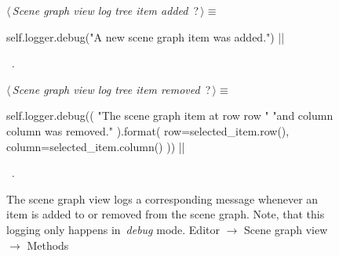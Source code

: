 \documentclass[%
    a4paper,    %
    justified,  %
    nobib,      %
    openany     %
]{tufte-book}
\makeatletter
\renewcommand{\label}[1]{\@tufte@label{##1}}%
\makeatother
\begin{document}
\begin{figure}
\begin{flushleft} \small
\begin{minipage}{\linewidth}\label{scrap60}\raggedright\small
{} $\langle\,${\itshape Scene graph view log tree item added}\nobreak\ {\footnotesize {?}}$\,\rangle\equiv$
\vspace{-1ex}
\begin{pythoncode}
self.logger.debug("A new scene graph item was added.")
|\NWsep|
\end{pythoncode}
\vspace{1.5ex}
\footnotesize
\begin{list}{}{\setlength{\itemsep}{-\parsep}\setlength{\itemindent}{-\leftmargin}}
\item \NWtxtMacroRefIn\ .

\item{}
\end{list}
\end{minipage}\vspace{4ex}
\end{flushleft}
\begin{flushleft} \small
\begin{minipage}{\linewidth}\label{scrap61}\raggedright\small
{} $\langle\,${\itshape Scene graph view log tree item removed}\nobreak\ {\footnotesize {?}}$\,\rangle\equiv$
\vspace{-1ex}
\begin{pythoncode}
self.logger.debug((
    "The scene graph item at row {row} "
    "and column {column} was removed."
).format(
    row=selected_item.row(),
    column=selected_item.column()
))
|\NWsep|
\end{pythoncode}
\vspace{1.5ex}
\footnotesize
\begin{list}{}{\setlength{\itemsep}{-\parsep}\setlength{\itemindent}{-\leftmargin}}
\item \NWtxtMacroRefIn\ .

\item{}
\end{list}
\end{minipage}\vspace{4ex}
\end{flushleft}
\caption{The scene graph view logs a corresponding message whenever an item is
  added to or removed from the scene graph. Note, that this logging only happens
  in~\emph{debug} mode.
  \newline{}\newline{}Editor $\rightarrow$ Scene graph view
  $\rightarrow$ Methods}
\label{logging:lst:scene-graph-view:methods:log-adding-removal}
\end{figure}
\end{document}
